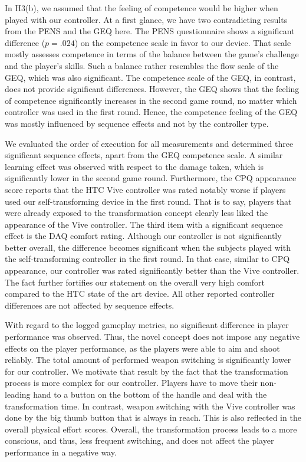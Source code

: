 \documentclass{sigchi}
\begin{document}
In H3(b), we assumed that the feeling of competence would be higher when played with our controller. At a first glance, we have two contradicting results from the PENS and the GEQ here. The PENS questionnaire shows a significant difference ($p = .024$) on the competence scale in favor to our device. That scale mostly assesses competence in terms of the balance between the game's challenge and the player's skills. Such a balance rather resembles the flow scale of the GEQ, which was also significant. The competence scale of the GEQ, in contrast, does not provide significant differences. However, the GEQ shows that the feeling of competence significantly increases in the second game round, no matter which controller was used in the first round. Hence, the competence feeling of the GEQ was mostly influenced by sequence effects and not by the controller type.


We evaluated the order of execution for all measurements and determined three significant sequence effects, apart from the GEQ competence scale. A similar learning effect was observed with respect to the damage taken, which is significantly lower in the second game round. Furthermore, the CPQ appearance score reports that the HTC Vive controller was rated notably worse if players used our self-transforming device in the first round. That is to say, players that were already exposed to the transformation concept clearly less liked the appearance of the Vive controller. The third item with a significant sequence effect is the DAQ comfort rating. Although our controller is not significantly better overall, the difference becomes significant when the subjects played with the self-transforming controller in the first round. In that case, similar to CPQ appearance, our controller was rated significantly better than the Vive controller. The fact further fortifies our statement on the overall very high comfort compared to the HTC state of the art device. All other reported controller differences are not affected by sequence effects.

With regard to the logged gameplay metrics, no significant difference in player performance was observed. Thus, the novel concept does not impose any negative effects on the player performance, as the players were able to aim and shoot reliably. The total amount of performed weapon switching is significantly lower for our controller. We motivate that result by the fact that the transformation process is more complex for our controller. Players have to move their non-leading hand to a button on the bottom of the handle and deal with the transformation time. In contrast, weapon switching with the Vive controller was done by the big thumb button that is always in reach. This is also reflected in the overall physical effort scores. Overall, the transformation process leads to a more conscious, and thus, less frequent switching, and does not affect the player performance in a negative way.
\end{document}
